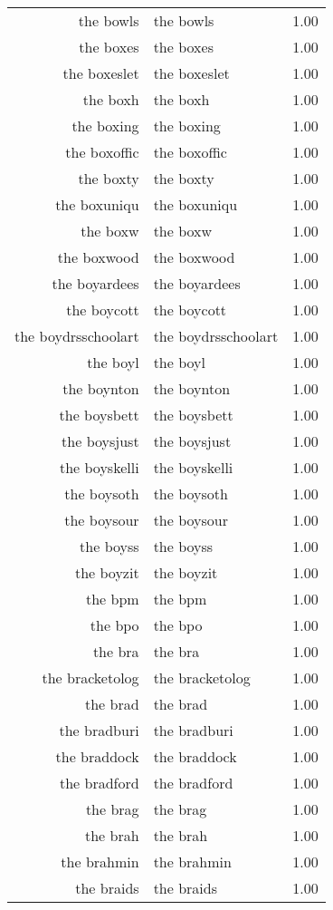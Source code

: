 \begin{table}[ht]
\begin{tabular}{rlr}
  the bowls & the bowls & 1.00 \\ 
  the boxes & the boxes & 1.00 \\ 
  the boxeslet & the boxeslet & 1.00 \\ 
  the boxh & the boxh & 1.00 \\ 
  the boxing & the boxing & 1.00 \\ 
  the boxoffic & the boxoffic & 1.00 \\ 
  the boxty & the boxty & 1.00 \\ 
  the boxuniqu & the boxuniqu & 1.00 \\ 
  the boxw & the boxw & 1.00 \\ 
  the boxwood & the boxwood & 1.00 \\ 
  the boyardees & the boyardees & 1.00 \\ 
  the boycott & the boycott & 1.00 \\ 
  the boydrsschoolart & the boydrsschoolart & 1.00 \\ 
  the boyl & the boyl & 1.00 \\ 
  the boynton & the boynton & 1.00 \\ 
  the boysbett & the boysbett & 1.00 \\ 
  the boysjust & the boysjust & 1.00 \\ 
  the boyskelli & the boyskelli & 1.00 \\ 
  the boysoth & the boysoth & 1.00 \\ 
  the boysour & the boysour & 1.00 \\ 
  the boyss & the boyss & 1.00 \\ 
  the boyzit & the boyzit & 1.00 \\ 
  the bpm & the bpm & 1.00 \\ 
  the bpo & the bpo & 1.00 \\ 
  the bra & the bra & 1.00 \\ 
  the bracketolog & the bracketolog & 1.00 \\ 
  the brad & the brad & 1.00 \\ 
  the bradburi & the bradburi & 1.00 \\ 
  the braddock & the braddock & 1.00 \\ 
  the bradford & the bradford & 1.00 \\ 
  the brag & the brag & 1.00 \\ 
  the brah & the brah & 1.00 \\ 
  the brahmin & the brahmin & 1.00 \\ 
  the braids & the braids & 1.00 \\ 

\end{tabular}
\end{table}
